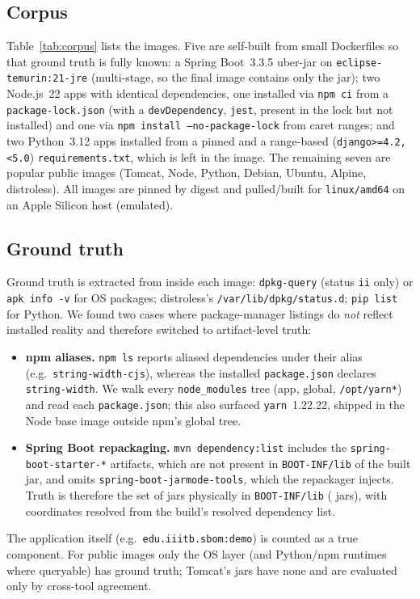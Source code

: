 \documentclass[conference]{IEEEtran}
\begin{document}
\subsection{Corpus}
Table~\ref{tab:corpus} lists the \NImages{} images. Five are self-built from small Dockerfiles so that
ground truth is fully known: a Spring Boot~3.3.5 uber-jar on \texttt{eclipse-temurin:21-jre}
(multi-stage, so the final image contains only the jar); two Node.js~22 apps with identical
dependencies, one installed via \texttt{npm ci} from a \texttt{package-lock.json} (with a
\texttt{devDependency}, \texttt{jest}, present in the lock but not installed) and one via
\texttt{npm install --no-package-lock} from caret ranges; and two Python~3.12 apps installed from a
pinned and a range-based (\texttt{django>=4.2,<5.0}) \texttt{requirements.txt}, which is left in the
image. The remaining seven are popular public images (Tomcat, Node, Python, Debian, Ubuntu, Alpine,
distroless). All images are pinned by digest and pulled/built for \texttt{linux/amd64} on an Apple
Silicon host (emulated).



\subsection{Ground truth}
Ground truth is extracted from inside each image: \texttt{dpkg-query} (status \texttt{ii} only) or
\texttt{apk info -v} for OS packages; distroless's \texttt{/var/lib/dpkg/status.d}; \texttt{pip list}
for Python. We found two cases where package-manager listings do \emph{not} reflect installed reality
and therefore switched to artifact-level truth:
\begin{itemize}
\item \textbf{npm aliases.} \texttt{npm ls} reports aliased dependencies under their alias
(e.g.\ \texttt{string-width-cjs}), whereas the installed \texttt{package.json} declares
\texttt{string-width}. We walk every \texttt{node\_modules} tree (app, global, \texttt{/opt/yarn*}) and
read each \texttt{package.json}; this also surfaced \texttt{yarn}~1.22.22, shipped in the Node base
image outside npm's global tree.
\item \textbf{Spring Boot repackaging.} \texttt{mvn dependency:list} includes the
\texttt{spring-boot-starter-*} artifacts, which are not present in \texttt{BOOT-INF/lib} of the built jar, and omits \texttt{spring-boot-jarmode-tools}, which the repackager
injects. Truth is therefore the set of jars physically in \texttt{BOOT-INF/lib}
(\NNestedJars{} jars), with coordinates resolved from the build's resolved dependency list.
\end{itemize}
The application itself (e.g.\ \texttt{edu.iiitb.sbom:demo}) is counted as a true component. For public
images only the OS layer (and Python/npm runtimes where queryable) has ground truth; Tomcat's jars have
none and are evaluated only by cross-tool agreement.
\end{document}

